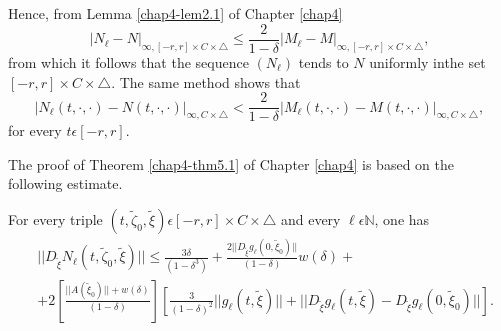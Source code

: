 Hence, from Lemma \ref{chap4-lem2.1} of Chapter \ref{chap4}
\begin{equation*}
|N_{\ell} - N|_{\infty, [-r, r] \times C \times \triangle} \leq
\frac{2}{1 - \delta} |M_{\ell} - M|_{\infty, [-r, r] \times C \times
  \triangle},\tag{A2.7} \label{app-2-eqA2.7}
\end{equation*}
from which it follows that the sequence $(N_{\ell})$ tends to $N$
uniformly in\pageoriginale the set $[-r, r] \times C \times \triangle$. The same
method shows that
\begin{equation*}
|N_{\ell}(t, \cdot, \cdot) -N(t, \cdot , \cdot)|_{\infty, C \times
  \triangle} < \frac{2}{1 - \delta} |M_{\ell} (t, \cdot , \cdot) -
M(t, \cdot, \cdot)|_{\infty, C \times \triangle},\tag*{(A2.7)$'$}\label{app-2-eqA2.7'}
\end{equation*}
for every $t \epsilon [-r, r]$.

The proof of Theorem \ref{chap4-thm5.1} of Chapter \ref{chap4} is
based on the following estimate. 

\begin{alphlemma}\label{app-2-lemA2.1}%
For every triple $(t, \widetilde{\zeta}_{0}, \widetilde{\xi}) \epsilon
[-r, r] \times C \times \triangle$ and every $\ell \epsilon
\mathbb{N}$, one has
\begin{align*}
& ||D_{\widetilde{\xi}}N_{\ell} (t, \widetilde{\zeta}_{0},
\widetilde{\xi})|| \leq \frac{3\delta}{(1 - \delta^{3})} +
\frac{2||D_{\widetilde{\xi}}g_{\ell} (0, \widetilde{\xi}_{0})||}{(1 -
  \delta)} w(\delta) +\\
& + 2 \left[\frac{||A(\widetilde{\xi}_{0})|| +
    w(\delta)}{(1-\delta)}\right] \left[\frac{3}{(1 - \delta)^{2}}||
  g_{\ell} (t, \widetilde{\xi})|| + ||D_{\widetilde{\xi}}g_{\ell} (t,
  \widetilde{\xi}) - D_{\widetilde{\xi}}g_{\ell} (0,
  \widetilde{\xi}_{0})||\right].\tag{A2.8} \label{app-2-eqA2.8}
\end{align*}
\end{alphlemma}


